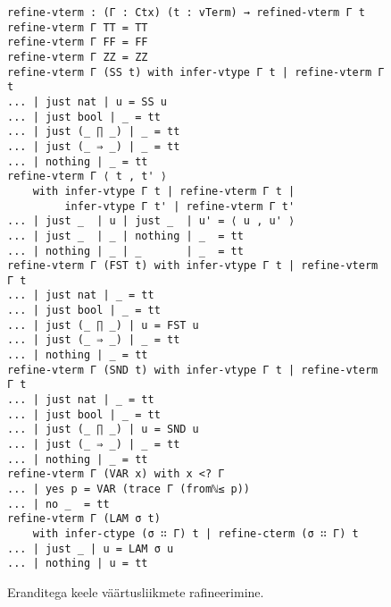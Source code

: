 \documentclass[a4paper,12pt]{article}
\begin{document}
\begin{figure}
  \begin{BVerbatim}
refine-vterm : (Γ : Ctx) (t : vTerm) → refined-vterm Γ t 
refine-vterm Γ TT = TT
refine-vterm Γ FF = FF
refine-vterm Γ ZZ = ZZ
refine-vterm Γ (SS t) with infer-vtype Γ t | refine-vterm Γ t
... | just nat | u = SS u
... | just bool | _ = tt
... | just (_ ∏ _) | _ = tt
... | just (_ ⇒ _) | _ = tt
... | nothing | _ = tt
refine-vterm Γ ⟨ t , t' ⟩
    with infer-vtype Γ t | refine-vterm Γ t |
         infer-vtype Γ t' | refine-vterm Γ t'
... | just _  | u | just _  | u' = ⟨ u , u' ⟩
... | just _  | _ | nothing | _  = tt
... | nothing | _ | _       | _  = tt
refine-vterm Γ (FST t) with infer-vtype Γ t | refine-vterm Γ t
... | just nat | _ = tt
... | just bool | _ = tt
... | just (_ ∏ _) | u = FST u
... | just (_ ⇒ _) | _ = tt
... | nothing | _ = tt
refine-vterm Γ (SND t) with infer-vtype Γ t | refine-vterm Γ t
... | just nat | _ = tt
... | just bool | _ = tt
... | just (_ ∏ _) | u = SND u
... | just (_ ⇒ _) | _ = tt
... | nothing | _ = tt
refine-vterm Γ (VAR x) with x <? Γ
... | yes p = VAR (trace Γ (fromℕ≤ p))
... | no _  = tt
refine-vterm Γ (LAM σ t)
    with infer-ctype (σ ∷ Γ) t | refine-cterm (σ ∷ Γ) t
... | just _ | u = LAM σ u
... | nothing | u = tt
  \end{BVerbatim}
  \caption{Eranditega keele väärtusliikmete rafineerimine.}
  \label{fig:exc.refine-vterm}
\end{figure}
\end{document}
